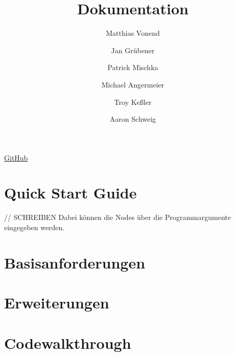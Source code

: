 \documentclass[a4paper]{article}
\title{Dokumentation}
\author{
    Matthias Vonend
    \and
    Jan Grübener
    \and
    Patrick Mischka
    \and
    Michael Angermeier
    \and
    Troy Keßler
    \and
    Aaron Schweig
}
\theoremstyle{definition}
\begin{document}
    \maketitle

    \begin{center}
      \href{https://github.com/aaronschweig/vs-chat/}{GitHub}
    \end{center}

    \tableofcontents
    \clearpage

    \author{}
    \section{Quick Start Guide}
    // SCHREIBEN
    Dabei können die Nodes über die Programmargumente eingegeben werden.
    \author{}
    \section{Basisanforderungen}
        
    \author{}
    \section{Erweiterungen}
        
    \clearpage
    \author{}
    \section{Codewalkthrough}
        
    
\end{document}
